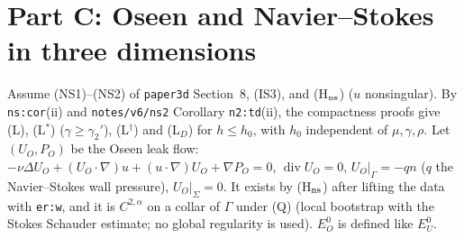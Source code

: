 \documentclass[11pt,reqno]{amsart}
\theoremstyle{plain}
\theoremstyle{definition}
\renewcommand{\div}{\operatorname{div}}
\begin{document}
\section{Part C: Oseen and Navier--Stokes in three dimensions}\label{sec:C}
Assume (NS1)--(NS2) of \texttt{paper3d} Section~8, (IS3), and (H$_{\rm ns}$) ($u$ nonsingular). By \texttt{ns:cor}(ii) and \texttt{notes/v6/ns2} Corollary \texttt{n2:td}(ii), the compactness proofs give (L), (L$^\ast$) ($\gamma\ge\gamma_2'$), (L$^\dagger$) and (L$_D$) for $h\le h_0$, with $h_0$ independent of $\mu,\gamma,\rho$. Let $(U_O,P_O)$ be the Oseen leak flow: $-\nu\Delta U_O+(U_O\cdot\nabla)u+(u\cdot\nabla)U_O+\nabla P_O=0$, $\div U_O=0$, $U_O|_\Gamma=-qn$ ($q$ the Navier--Stokes wall pressure), $U_O|_\Sigma=0$. It exists by (H$_{\rm ns}$) after lifting the data with \texttt{er:w}, and it is $C^{2,\alpha}$ on a collar of $\Gamma$ under (Q) (local bootstrap with the Stokes Schauder estimate; no global regularity is used). $E^0_O$ is defined like $E^0_U$.
\end{document}
